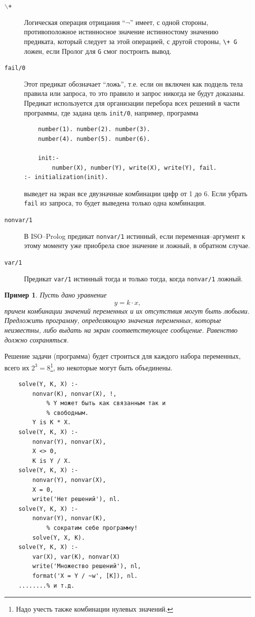\documentclass[12pt, openany, twoside]{book} %
\newtheorem{example}{Пример}[chapter]
\begin{document}
\begin{description}
\item[{\tt $\backslash$+}] Логическая операция отрицания ``$\neg$'' имеет, с одной стороны, противоположное истинносное значение истинностому значению пре\-ди\-ка\-та, который следует за этой операцией, с другой стороны, {\tt \verb|\+| G} ложен, если Пролог для  {\tt G} смог построить вывод.
\item[\tt fail/0] Этот предикат обозначает ``ложь'', т.е. если он включен как подцель тела правила или запроса, то это правило и запрос никогда не будут доказаны. Предикат используется для организации перебора всех решений в части программы, где задана цель \texttt{init/0}, например, программа
{\tt \begin{verbatim}
    number(1). number(2). number(3).
    number(4). number(5). number(6).

    init:-
        number(X), number(Y), write(X), write(Y), fail.
:- initialization(init).
\end{verbatim}}
выведет на экран все двузначные комбинации цифр от 1 до 6. Если убрать {\tt fail} из запроса, то будет выведена только одна комбинация.
\item[\tt nonvar/1] В ISO--Prolog предикат {\tt nonvar/1} истинный, если пе\-ре\-мен\-ная--аргумент к этому моменту уже приобрела свое значение и ложный, в обратном случае.
\item[\tt var/1] Предикат {\tt var/1} истинный тогда и только тогда, когда {\tt nonvar/1} ложный.
\end{description}

\begin{example}  Пусть дано уравнение
$$
    y=k\cdot x,
$$
причем комбинации значений переменных и их отсутствия могут быть любыми. Предложить программу, определяющую значения переменных, которые неизвестны,  либо выдать на экран соответствующее сообщение. Равенство должно сохраняться.
\end{example}

Решение задачи (программа) будет строиться для каждого набора переменных, всего их $2^3=8$\footnote{Надо учесть также комбинации нулевых значений.}, но некоторые могут быть объединены.

{\tt \begin{verbatim}
    solve(Y, K, X) :-
        nonvar(K), nonvar(X), !,
            % Y может быть как связанным так и
            % свободным.
        Y is K * X.
    solve(Y, K, X) :-
        nonvar(Y), nonvar(X),
        X <> 0,
        K is Y / X.
    solve(Y, K, X) :-
        nonvar(Y), nonvar(X),
        X = 0,
        write('Нет решений'), nl.
    solve(Y, K, X) :-
        nonvar(Y), nonvar(K),
            % сократим себе программу!
        solve(Y, X, K).
    solve(Y, K, X) :-
        var(X), var(K), nonvar(X)
        write('Множество решений'), nl,
        format('X = Y / ~w', [K]), nl.
    ........% и т.д.
\end{verbatim}}
\end{document}
